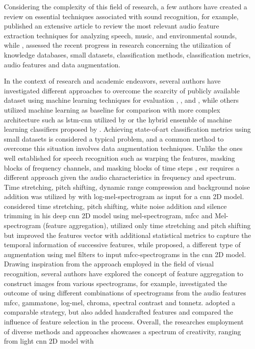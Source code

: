 
Considering the complexity of this field of research, a few authors have created a review on essential techniques associated with sound recognition, for example, \textcite{Alias2016} published an extensive article to review the most relevant audio feature extraction techniques for analyzing speech, music, and environmental sounds, while \textcite{Alli2022}, assessed the recent progress in research concerning the utilization of knowledge databases, small datasets, classification methods, classification metrics, audio features and data augmentation.

In the context of research and academic endeavors, several authors have investigated different approaches to overcome the scarcity of publicly available dataset using machine learning techniques for evaluation  \cite{Salamon2014}, \cite{Bountourakis2015}, and \cite{Piczak2015}, while others utilized machine learning as baseline for comparison with more complex architecture such as \gls{lstm}-\gls{cnn} utilized by \textcite{Pandya2021} or the hybrid ensemble of machine learning classifiers proposed by \textcite{Bansal2022}. Achieving state-of-art classification metrics using small datasets is considered a typical problem, and a common method to overcome this situation involves data augmentation techniques. Unlike the ones well established for speech recognition such as warping the features, masking blocks of frequency channels, and masking blocks of time steps \cite{Park2019}, \gls{esr} requires a different approach given the audio characteristics in frequency and spectrum. Time stretching, pitch shifting, dynamic range compression and background noise addition was utilized by \textcite{Salamon2017} with log-mel-spectrogram as input for a \gls{cnn} 2D model. \textcite{Mushtaq2020a} considered time stretching, pitch shifting, white noise addition and silence trimming in his deep \gls{cnn} 2D model using mel-spectrogram, \gls{mfcc} and Mel-spectrogram (feature aggregation), \textcite{Bountourakis2019} utilized only time stretching and pitch shifting but improved the features vector with additional statistical metrics to capture the temporal information of successive features, while \textcite{Chu2023} proposed, a different type of augmentation using mel filters to input \gls{mfcc}-spectrograms in the \gls{cnn} 2D model. Drawing inspiration from the approach employed in the field of visual recognition, several authors have explored the concept of feature aggregation to construct images from various spectrograms, for example, \textcite{Su2020} investigated the outcome of using different combinations of spectrograms from the audio features \gls{mfcc}, gammatone, log-mel, chroma, spectral contrast and tonnetz. \textcite{Luz2021} adopted a comparable strategy, but also added handcrafted features and compared the influence of feature selection in the process. Overall, the researches employment of diverse methods and approaches showcases a spectrum of creativity, ranging from light \gls{cnn} 2D model with 